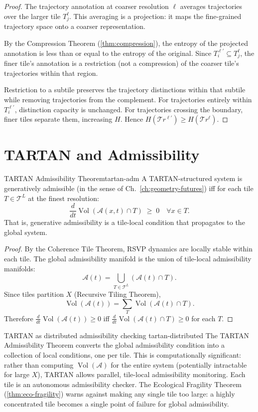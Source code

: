 \documentclass[12pt,twoside,openright]{book}
\newcommand{\adm}{\mathcal{A}}
\newcommand{\Vol}{\operatorname{Vol}}
\begin{document}
\begin{proof}
  The trajectory annotation at coarser resolution
  $\ell$ averages trajectories over the larger tile
  $T^\ell_j$. This averaging is a projection:
  it maps the fine-grained trajectory space onto a
  coarser representation.

  By the Compression Theorem (\cref{thm:compression}),
  the entropy of the projected annotation is less than
  or equal to the entropy of the original.
  Since $T^{\ell'}_i \subseteq T^\ell_j$, the finer
  tile's annotation is a restriction (not a compression)
  of the coarser tile's trajectories within that region.

  Restriction to a subtile preserves the trajectory
  distinctions within that subtile while removing
  trajectories from the complement. For trajectories
  entirely within $T^{\ell'}_i$, distinction capacity
  is unchanged. For trajectories crossing the boundary,
  finer tiles separate them, increasing $H$.
  Hence $H(\mathcal{T}\!r^{\ell'}) \ge H(\mathcal{T}\!r^\ell)$.
\end{proof}

\section{TARTAN and Admissibility}

\begin{theorem}{TARTAN Admissibility Theorem}{tartan-adm}
  A TARTAN-structured system is generatively admissible
  (in the sense of Ch.~\ref{ch:geometry-futures}) iff
  for each tile $T \in \mathcal{T}^L$ at the finest
  resolution:
  \[
    \frac{d}{dt}\Vol(\adm(x, t) \cap T)
    \;\ge\; 0
    \quad \forall x \in T.
  \]
  That is, generative admissibility is a tile-local
  condition that propagates to the global system.
\end{theorem}

\begin{proof}
  By the Coherence Tile Theorem, RSVP dynamics are
  locally stable within each tile. The global
  admissibility manifold is the union of tile-local
  admissibility manifolds:
  \[
    \adm(t) = \bigcup_{T \in \mathcal{T}^L}
    (\adm(t) \cap T).
  \]
  Since tiles partition $X$ (Recursive Tiling Theorem),
  \[
    \Vol(\adm(t))
    = \sum_{T} \Vol(\adm(t) \cap T).
  \]
  Therefore $\frac{d}{dt}\Vol(\adm(t)) \ge 0$ iff
  $\frac{d}{dt}\Vol(\adm(t) \cap T) \ge 0$ for each $T$.
\end{proof}

\begin{remark}{TARTAN as distributed admissibility checking}%
  {tartan-distributed}
  The TARTAN Admissibility Theorem converts the global
  admissibility condition into a collection of local
  conditions, one per tile. This is computationally
  significant: rather than computing $\Vol(\adm)$ for
  the entire system (potentially intractable for large
  $X$), TARTAN allows parallel, tile-local admissibility
  monitoring. Each tile is an autonomous admissibility
  checker. The Ecological Fragility Theorem
  (\cref{thm:eco-fragility}) warns against making any
  single tile too large: a highly concentrated tile
  becomes a single point of failure for global
  admissibility.
\end{remark}
\end{document}
